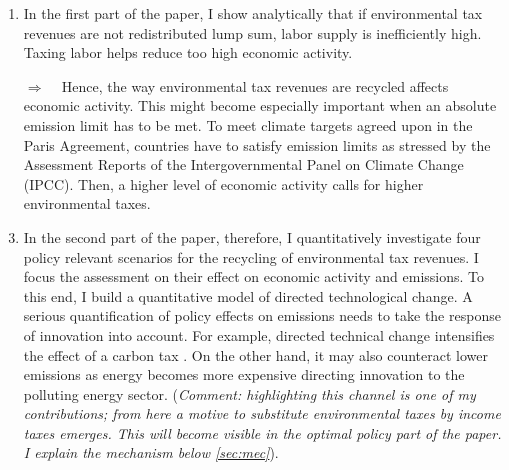 \documentclass[12pt]{article}
\newcommand{\ar}{$\Rightarrow$ \ }
\begin{document}
	\begin{enumerate}
\item In the first part of the paper, I show analytically that if environmental tax revenues are not redistributed lump sum, labor supply is inefficiently high. Taxing labor helps reduce too high economic activity. 

\item[\ar] Hence, the way environmental tax revenues are recycled affects economic activity. This might become especially important when an absolute emission limit has to be met. To meet climate targets agreed upon in the Paris Agreement, countries have to satisfy emission limits as stressed by the Assessment Reports of the Intergovernmental Panel on Climate Change (IPCC). Then, a higher level of economic activity calls for higher environmental taxes. 

\item In the second part of the paper, therefore, I quantitatively
investigate four policy relevant scenarios for the recycling of environmental tax revenues.  I focus the assessment on their effect on economic activity and emissions. 
To this end, I build a quantitative model of directed technological change. A serious quantification of policy effects on emissions needs to take the response of innovation into account. For example, directed technical change intensifies the effect of a carbon tax \cite{Fried2018ClimateAnalysis}. On the other hand, it may also counteract lower emissions as energy becomes more expensive directing innovation to the polluting energy sector. (\textit{Comment: highlighting this channel is one of my contributions; from here a motive to substitute environmental taxes by income taxes emerges. This will become visible in the optimal policy part of the paper. I explain the mechanism below \ref{sec:mec}}).  


\end{enumerate}
\end{document}
